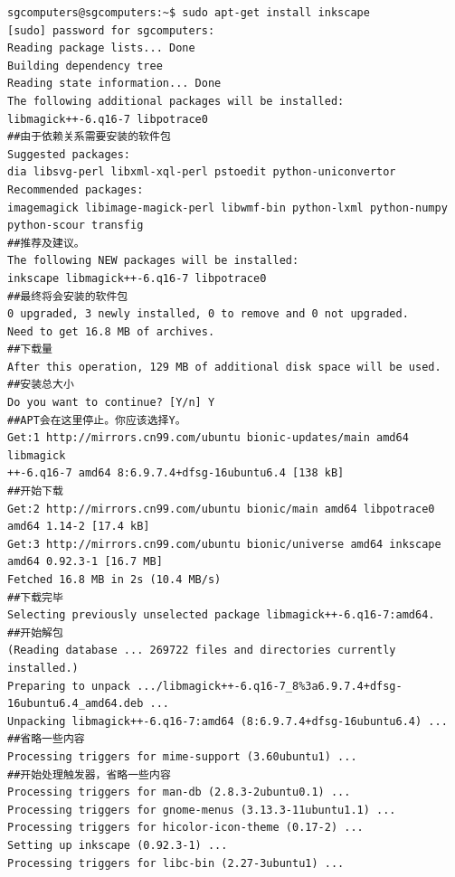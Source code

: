 \begin{verbatim}
sgcomputers@sgcomputers:~$ sudo apt-get install inkscape
[sudo] password for sgcomputers: 
Reading package lists... Done
Building dependency tree       
Reading state information... Done
The following additional packages will be installed:
libmagick++-6.q16-7 libpotrace0
##由于依赖关系需要安装的软件包
Suggested packages:
dia libsvg-perl libxml-xql-perl pstoedit python-uniconvertor
Recommended packages:
imagemagick libimage-magick-perl libwmf-bin python-lxml python-numpy
python-scour transfig
##推荐及建议。
The following NEW packages will be installed:
inkscape libmagick++-6.q16-7 libpotrace0
##最终将会安装的软件包
0 upgraded, 3 newly installed, 0 to remove and 0 not upgraded.
Need to get 16.8 MB of archives.
##下载量
After this operation, 129 MB of additional disk space will be used.
##安装总大小
Do you want to continue? [Y/n] Y
##APT会在这里停止。你应该选择Y。
Get:1 http://mirrors.cn99.com/ubuntu bionic-updates/main amd64 libmagick
++-6.q16-7 amd64 8:6.9.7.4+dfsg-16ubuntu6.4 [138 kB]
##开始下载
Get:2 http://mirrors.cn99.com/ubuntu bionic/main amd64 libpotrace0 amd64 1.14-2 [17.4 kB]
Get:3 http://mirrors.cn99.com/ubuntu bionic/universe amd64 inkscape amd64 0.92.3-1 [16.7 MB]
Fetched 16.8 MB in 2s (10.4 MB/s)
##下载完毕 
Selecting previously unselected package libmagick++-6.q16-7:amd64.
##开始解包
(Reading database ... 269722 files and directories currently installed.)
Preparing to unpack .../libmagick++-6.q16-7_8%3a6.9.7.4+dfsg-16ubuntu6.4_amd64.deb ...
Unpacking libmagick++-6.q16-7:amd64 (8:6.9.7.4+dfsg-16ubuntu6.4) ...
##省略一些内容
Processing triggers for mime-support (3.60ubuntu1) ...
##开始处理触发器，省略一些内容
Processing triggers for man-db (2.8.3-2ubuntu0.1) ...
Processing triggers for gnome-menus (3.13.3-11ubuntu1.1) ...
Processing triggers for hicolor-icon-theme (0.17-2) ...
Setting up inkscape (0.92.3-1) ...
Processing triggers for libc-bin (2.27-3ubuntu1) ...
\end{verbatim}
